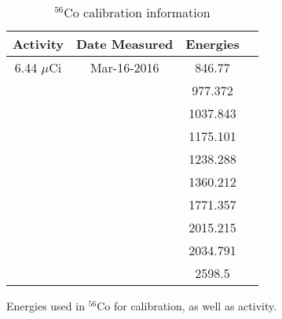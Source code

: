 \begin{table}[]
    \centering
    \caption{$^{56}$Co calibration information}
    \begin{tabular}{c|c|c|c}
         Activity & Date Measured & Energies  \\ \hline
         6.44 $\mu$Ci & Mar-16-2016 & 846.77 \\
         & & 977.372 \\
         & & 1037.843 \\
         & & 1175.101 \\
         & & 1238.288 \\
         & & 1360.212 \\
         & & 1771.357 \\
         & & 2015.215 \\
         & & 2034.791 \\
         & & 2598.5 \\
    \end{tabular}
    \footnotesize
    \item Energies used in $^{56}$Co for calibration, as well as activity.
    \label{tab:Co_Energy}
\end{table}